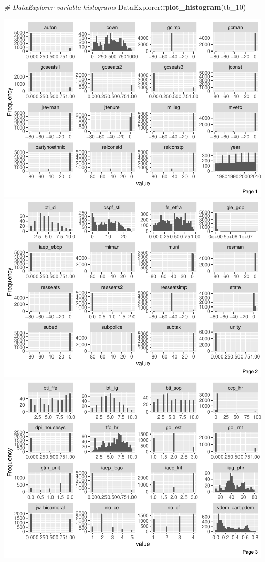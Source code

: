 \documentclass[
]{article}
\newenvironment{Shaded}{\begin{snugshade}}{\end{snugshade}}
\newcommand{\CommentTok}[1]{\textcolor[rgb]{0.56,0.35,0.01}{\textit{#1}}}
\newcommand{\DecValTok}[1]{\textcolor[rgb]{0.00,0.00,0.81}{#1}}
\newcommand{\KeywordTok}[1]{\textcolor[rgb]{0.13,0.29,0.53}{\textbf{#1}}}
\newcommand{\NormalTok}[1]{#1}
\newcommand{\OperatorTok}[1]{\textcolor[rgb]{0.81,0.36,0.00}{\textbf{#1}}}
\begin{document}
\begin{Shaded}
\begin{Highlighting}[]
\CommentTok{# DataExplorer variable histograms}
\NormalTok{DataExplorer}\OperatorTok{::}\KeywordTok{plot_histogram}\NormalTok{(tb_}\DecValTok{10}\NormalTok{)}
\end{Highlighting}
\end{Shaded}

\includegraphics{01_tjbrailey_wrangle_data_files/figure-latex/unnamed-chunk-13-1.pdf}
\includegraphics{01_tjbrailey_wrangle_data_files/figure-latex/unnamed-chunk-13-2.pdf}
\includegraphics{01_tjbrailey_wrangle_data_files/figure-latex/unnamed-chunk-13-3.pdf}
\end{document}
